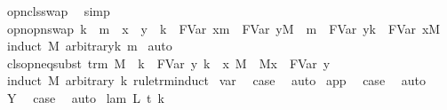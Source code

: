 \begin{isabellebody}
%
\isadelimproof
%
\endisadelimproof
%
\isatagproof
{}\isamarkupfalse%
\ opn{\isacharunderscore}cls{\isacharunderscore}swap\ \isamarkupfalse%
\ simp%
\endisatagproof
{\isafoldproof}%
%
\isadelimproof
\isanewline
%
\endisadelimproof
\isanewline
{}\isamarkupfalse%
\ opn{\isacharunderscore}opn{\isacharunderscore}swap{\isacharcolon}\ {\isachardoublequoteopen}k\ {\isasymnoteq}\ m\ {\isasymLongrightarrow}\ x\ {\isasymnoteq}\ y\ {\isasymLongrightarrow}\ {\isacharbraceleft}k\ {\isasymrightarrow}\ FVar\ x{\isacharbraceright}{\isacharbraceleft}m\ {\isasymrightarrow}\ FVar\ y{\isacharbraceright}M\ {\isacharequal}\ {\isacharbraceleft}m\ {\isasymrightarrow}\ FVar\ y{\isacharbraceright}{\isacharbraceleft}k\ {\isasymrightarrow}\ FVar\ x{\isacharbraceright}M{\isachardoublequoteclose}\isanewline
%
\isadelimproof
%
\endisadelimproof
%
\isatagproof
{}\isamarkupfalse%
\ {\isacharparenleft}induct\ M\ arbitrary{\isacharcolon}k\ m{\isacharparenright}\isanewline
{}\isamarkupfalse%
\ auto%
\endisatagproof
{\isafoldproof}%
%
\isadelimproof
\isanewline
%
\endisadelimproof
\isanewline
{}\isamarkupfalse%
\ cls{\isacharunderscore}opn{\isacharunderscore}eq{\isacharunderscore}subst{\isacharcolon}\ {\isachardoublequoteopen}trm\ M\ {\isasymLongrightarrow}\ {\isacharparenleft}{\isacharbraceleft}k\ {\isasymrightarrow}\ FVar\ y{\isacharbraceright}\ {\isacharbraceleft}k\ {\isacharless}{\isacharminus}\ x{\isacharbraceright}\ M{\isacharparenright}\ {\isacharequal}\ {\isacharparenleft}M{\isacharbrackleft}x\ {\isacharcolon}{\isacharcolon}{\isacharequal}\ FVar\ y{\isacharbrackright}{\isacharparenright}{\isachardoublequoteclose}\isanewline
%
\isadelimproof
%
\endisadelimproof
%
\isatagproof
{}\isamarkupfalse%
\ {\isacharparenleft}induct\ M\ arbitrary{\isacharcolon}\ k\ rule{\isacharcolon}trm{\isachardot}induct{\isacharparenright}\isanewline
{}\isamarkupfalse%
\ var\ \isamarkupfalse%
\ {\isacharquery}case\ \isamarkupfalse%
\ auto\isanewline
{}\isamarkupfalse%
\isanewline
{}\isamarkupfalse%
\ app\ \isamarkupfalse%
\ {\isacharquery}case\ \isamarkupfalse%
\ auto\isanewline
{}\isamarkupfalse%
\isanewline
{}\isamarkupfalse%
\ Y\ \isamarkupfalse%
\ {\isacharquery}case\ \isamarkupfalse%
\ auto\isanewline
{}\isamarkupfalse%
\isanewline
{}\isamarkupfalse%
\ {\isacharparenleft}lam\ L\ t\ k{\isacharparenright}\ \isanewline

\end{isabellebody}
